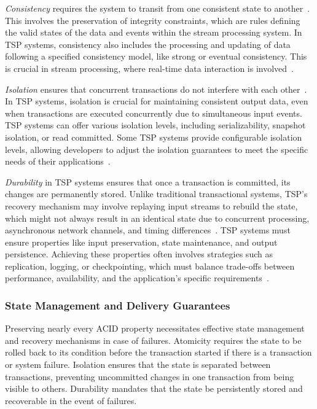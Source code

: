 {\em Consistency} requires the system to transit from one consistent state to another~\cite{zhang2024survey}. This involves the preservation of integrity constraints, which are rules defining the valid states of the data and events within the stream processing system. In TSP systems, consistency also includes the processing and updating of data following a specified consistency model, like strong or eventual consistency. This is crucial in stream processing, where real-time data interaction is involved~\cite{affetti2017flowdb, zhang2020towards}.

{\em Isolation} ensures that concurrent transactions do not interfere with each other~\cite{zhang2024survey}. In TSP systems, isolation is crucial for maintaining consistent output data, even when transactions are executed concurrently due to simultaneous input events. TSP systems can offer various isolation levels, including serializability, snapshot isolation, or read committed. Some TSP systems provide configurable isolation levels, allowing developers to adjust the isolation guarantees to meet the specific needs of their applications~\cite{affetti2017flowdb}.

{\em Durability} in TSP systems ensures that once a transaction is committed, its changes are permanently stored. Unlike traditional transactional systems, TSP's recovery mechanism may involve replaying input streams to rebuild the state, which might not always result in an identical state due to concurrent processing, asynchronous network channels, and timing differences~\cite{thepaper}. TSP systems must ensure properties like input preservation, state maintenance, and output persistence. Achieving these properties often involves strategies such as replication, logging, or checkpointing, which must balance trade-offs between performance, availability, and the application's specific requirements~\cite{zhang2024survey}.

\subsubsection{State Management and Delivery Guarantees}

Preserving nearly every ACID property necessitates effective state management and recovery mechanisms in case of failures. Atomicity requires the state to be rolled back to its condition before the transaction started if there is a transaction or system failure. Isolation ensures that the state is separated between transactions, preventing uncommitted changes in one transaction from being visible to others. Durability mandates that the state be persistently stored and recoverable in the event of failures.

